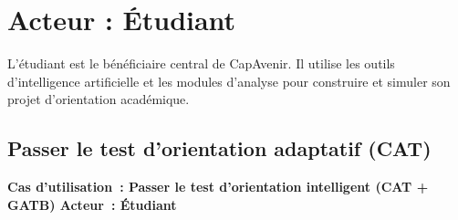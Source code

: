 \documentclass[a4paper,12pt]{article}
\newcommand{\ucheader}[2]{%
  \noindent\colorbox{capblue}{\parbox{\dimexpr\linewidth-2\fboxsep}{%
    \color{white}\bfseries\large Cas d'utilisation~: #1 \hfill \normalsize Acteur~: #2
  }}\\[2pt]
}
\begin{document}
\newpage

\section{Acteur : Étudiant}

L'étudiant est le bénéficiaire central de CapAvenir. Il utilise les outils d'intelligence artificielle et les modules d'analyse pour construire et simuler son projet d'orientation académique.

\subsection{Passer le test d'orientation adaptatif (CAT)}
\ucheader{Passer le test d'orientation intelligent (CAT + GATB)}{Étudiant}
\end{document}
